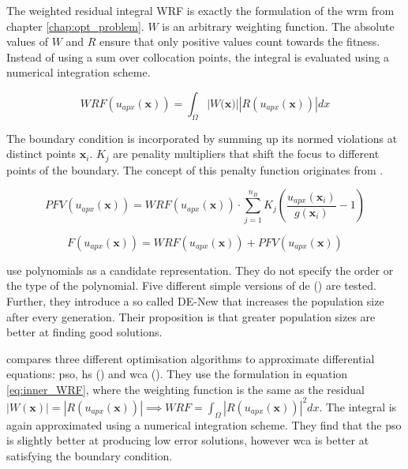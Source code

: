 \documentclass[./\jobname.tex]{subfiles}
\begin{document}
The weighted residual integral WRF is exactly the formulation of the \gls{wrm} from chapter \ref{chap:opt_problem}. $W$ is an arbitrary weighting function. The absolute values of $W$ and $R$ ensure that only positive values count towards the fitness. Instead of using a sum over collocation points, the integral is evaluated using a numerical integration scheme.

\begin{equation}
\label{eq:inner_WRF}
WRF(u_{apx}(\mathbf{x})) = \int_{\Omega} |W(\mathbf{x)}| |R(u_{apx}(\mathbf{x}))| dx
\end{equation} 

The boundary condition is incorporated by summing up its normed violations at distinct points $\mathbf{x}_i$. $K_j$ are penality multipliers that shift the focus to different points of the boundary. The concept of this penalty function originates from \cite{rajeev_discrete_1992}.

\begin{equation}
\label{eq:boundary_penalty}
PFV(u_{apx}(\mathbf{x})) = WRF(u_{apx}(\mathbf{x})) \cdot \sum_{j=1}^{n_B} K_j \left(\frac{u_{apx}(\mathbf{x}_i)}{g(\mathbf{x}_i)} - 1\right)
\end{equation}

\begin{equation}
\label{eq:inner_and_boundary_fitness}
F(u_{apx}(\mathbf{x})) = WRF(u_{apx}(\mathbf{x})) + PFV(u_{apx}(\mathbf{x}))
\end{equation}

\cite{panagant_solving_2014} use polynomials as a candidate representation. They do not specify the order or the type of the polynomial. Five different simple versions of \gls{de} (\cite{storn_differential_1997}) are tested. Further, they introduce a so called DE-New that increases the population size after every generation. Their proposition is that greater population sizes are better at finding good solutions. 

\cite{sadollah_metaheuristic_2017} compares three different optimisation algorithms to approximate differential equations: \gls{pso}, \gls{hs} (\cite{geem_new_2001}) and \gls{wca} (\cite{eskandar_water_2012}). They use the formulation in equation \eqref{eq:inner_WRF}, where the weighting function is the same as the residual $|W(\mathbf{x})| = |R(u_{apx}(\mathbf{x}))| \implies WRF = \int_{\Omega} |R(u_{apx}(\mathbf{x}))|^2 dx$. The integral is again approximated using a numerical integration scheme. They find that the \gls{pso} is slightly better at producing low error solutions, however \gls{wca} is better at satisfying the boundary condition. 
\end{document}
